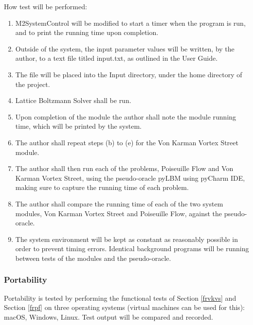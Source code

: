 \documentclass[12pt, titlepage]{article}
\newcommand{\famname}{Lattice Boltzmann Solver}
\begin{document}
\begin{enumerate}
How test will be performed: 

\begin{enumerate}
\item M2SystemControl will be modified to start a timer when the program is run, and to print the running time upon completion.	
\item Outside of the system, the input parameter values will be written, by the
author, to a text file titled input.txt, as outlined in the User
Guide.
\item The file will be placed into the Input directory, under the home directory
of the project.
\item {\famname} shall be run.
\item Upon completion of the module the author shall note the module running
time, which will be printed by the system.
\item The author shall repeat steps (b) to (e) for the Von Karman Vortex Street
module.
\item The author shall then run each of the problems, Poiseuille Flow and Von
Karman Vortex Street, using the pseudo-oracle pyLBM using pyCharm IDE, making
sure to capture the running time of each problem.
\item The author shall compare the running time of each of the two system
modules, Von Karman Vortex Street and Poiseuille Flow, against the
pseudo-oracle.
\item The system environment will be kept as constant as reasonably possible in order to prevent timing errors. Identical background programs will be running between tests of the modules and the pseudo-oracle.
\end{enumerate}

\end{enumerate}


\subsubsection{Portability}
		
Portability is tested by performing the functional tests of Section \ref{frvkvs} and Section \ref{frpf} on three operating systems (virtual machines can be used for this): macOS, Windows, Linux. Test output will be compared and recorded.
\end{document}
